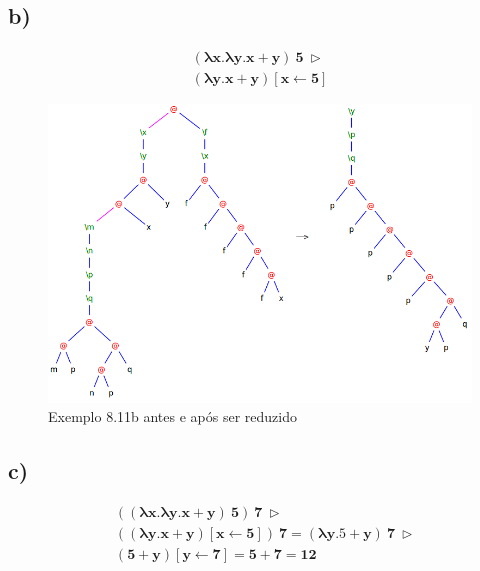 \documentclass[a4paper]{article}
\begin{document}
\FloatBarrier
\subsection*{b)}
\begin{align*}
\mathbf{(\lambda x.\lambda y.x + y)\ 5\ \rhd }\\
\mathbf{(\lambda y.x + y) [x \leftarrow 5]}
\end{align*}

\begin{figure}[h]
  \centering
  \includegraphics[scale=0.5]{8-11_b.png}
  \caption{Exemplo 8.11b antes e após ser reduzido}
\end{figure}

\FloatBarrier

\subsection*{c)}

\begin{align*}
&\mathbf{((\lambda x.\lambda y.x + y)\ 5)\ 7\ \rhd} \\
&\mathbf{((\lambda y.x + y) [x \leftarrow 5])\ 7 = (\lambda y.5 + y)\ 7\ \rhd} \\
&\mathbf{(5 + y)[y \leftarrow 7] = 5 + 7 = 12}
\end{align*}
\end{document}
